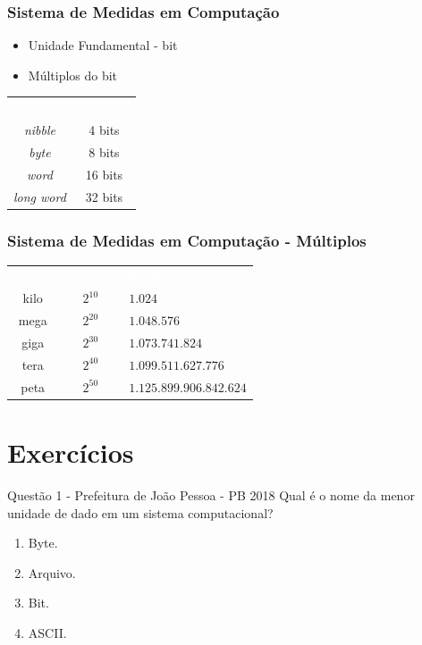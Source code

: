 \documentclass[aspectratio=169,
				xcolor=table]{beamer}
\begin{document}
	\begin{frame}
		\frametitle{Sistema de Medidas em Computação}
		\begin{itemize}
			\item Unidade Fundamental - bit	
			\item Múltiplos do bit					
		\end{itemize}
		\begin{eftable}
			\Large
			\begin{tabular}{c | c}
				\textcolor{white}{Unidade} & 
				\textcolor{white}{Tamanho} \\
				\textit{nibble} & 4 bits \\
				\textit{byte} & 8 bits \\
				\textit{word} & 16 bits \\
				\textit{long word} & 32 bits
			\end{tabular}
		\end{eftable}
	\end{frame}
	
	\begin{frame}	
		\frametitle{Sistema de Medidas em Computação - Múltiplos}
		\begin{eftable}
			\Large
			\begin{tabular}{c | c | l}
				\textcolor{white}{Prefixo} &
				\textcolor{white}{Expoente} &
				\textcolor{white}{Explícito} \\
				kilo & $2^{10}$ & $1.024$ \\
				mega & $2^{20}$ & $1.048.576$ \\
				giga & $2^{30}$ & $1.073.741.824$ \\
				tera & $2^{40}$ & $1.099.511.627.776$ \\
				peta & $2^{50}$ & $1.125.899.906.842.624$ \\
			\end{tabular}
		\end{eftable}
	\end{frame}

	\section{Exercícios}
	
	\begin{frame}{Questão 1 - Prefeitura de João Pessoa - PB 2018}
		Qual é o nome da menor unidade de dado em um sistema computacional?
		\begin{enumerate}[A]
			\item Byte.
			\item Arquivo.
			\item Bit.
			\item ASCII.
		\end{enumerate}

	\end{frame}
\end{document}
